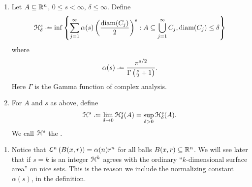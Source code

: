 \begin{defn}
  \begin{enumerate}\mbox{}
    \item Let $A\subseteq \mathbb{R}^n$, $0\le s < \infty$, $\delta \le \infty$.
    Define
    \begin{equation*}
      \mcal{H}_\delta^s \deq \inf\left\{ \sum_{j=1}^\infty
      \alpha(s)\left( \frac{\text{diam}(C_j)}{2} \right)^s : A\sub
      \bigcup_{j=1}^\infty C_j, \text{diam}(C_j) \le \delta  \right\}
    \end{equation*}
    where
    \begin{equation*}
      \alpha(s) \deq \frac{\pi^{s/2}}{\Gamma\left(\frac{s}{2}+1\right)}.
    \end{equation*}
    Here $\Gamma$ is the Gamma function of complex analysis.
    \item For $A$ and $s$ as above, define
      \begin{equation*}
        \mcal{H}^s \deq \lim_{\delta\to 0}\mcal{H}_{\delta}^{s}(A) =
        \sup_{\delta > 0}\mcal{H}_{\delta}^s(A).
      \end{equation*}
      We call $\mathcal{H}^s$ the .
  \end{enumerate}
\end{defn}
\begin{remark}\mbox{}
  \begin{enumerate}
    \item Notice that $\mathcal{L}^n\left( B(x,r) \right) =
      \alpha(n)r^n$
      for all balls $B(x,r)\subseteq \mathbb{R}^n$. We will see later that
      if $s=k$ is an integer $\mathcal{H}^k$ agrees with the ordinary
      ``$k$-dimensional surface area'' on nice sets. This is the reason
      we include the normalizing constant $\alpha(s)$, in the
      definition.
  \end{enumerate}
\end{remark}


